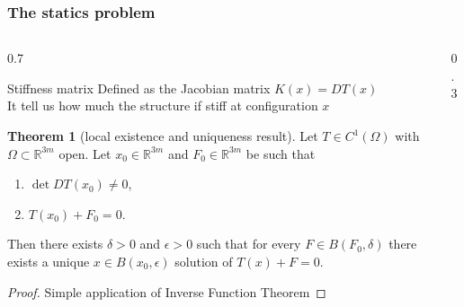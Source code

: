 \documentclass[10pt]{beamer}
\theoremstyle{definition}
\newtheorem{teorema}{Theorem}
\begin{document}
\begin{frame}

\frametitle{The statics problem}

\begin{columns}
\begin{column}{0.7\framewidth}
\begin{block}{Stiffness matrix}
Defined as the Jacobian matrix $K(x)=DT(x)$ \\
It tell us how much the structure if stiff at configuration $x$
\end{block}
\begin{teorema}[local existence and uniqueness result]
Let $T\in C^1(\Omega)$ with $\Omega\subset\mathbb{R}^{3m}$ open. Let $x_0\in\mathbb{R}^{3m}$ and $F_0\in\mathbb{R}^{3m}$ be such that
\begin{enumerate}
\item $\det DT(x_0)\neq0$,
\item $T(x_0)+F_0=0$.
\end{enumerate}
Then there exists $\delta>0$ and $\epsilon>0$ such that for every $F\in B(F_0,\delta)$ there exists a unique $x\in B(x_0,\epsilon)$ solution of $T(x)+F=0$.
\end{teorema}
\begin{proof}
Simple application of Inverse Function Theorem
\end{proof}
\end{column}
\begin{column}{0.3\framewidth}
\begin{center}
\end{center}
\vspace{20pt}
\begin{center}
\end{center}
\end{column}
\end{columns}

\end{frame}
\end{document}
